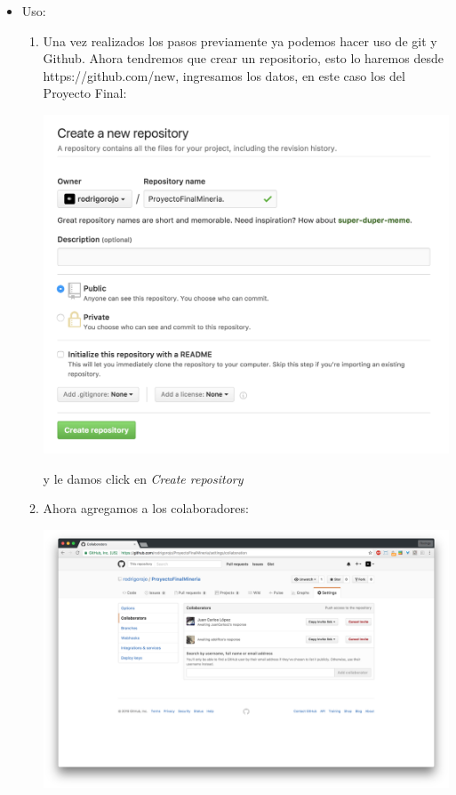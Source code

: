 \documentclass{article}
\begin{document}
\begin{itemize}
   \item Uso:
   \begin{enumerate}
     \item Una vez realizados los pasos previamente ya podemos hacer uso de git y Github. Ahora tendremos que crear un repositorio, esto lo haremos desde https://github.com/new, ingresamos los datos, en este caso los del Proyecto Final:
     \begin{center}
       \includegraphics[scale=0.5]{6}
     \end{center}
     y le damos click en \textit{Create repository}
     \item Ahora agregamos a los colaboradores:
     \begin{center}
       \includegraphics[scale=0.1]{7}

\end{center}
\end{enumerate}
\end{itemize}
\end{document}

